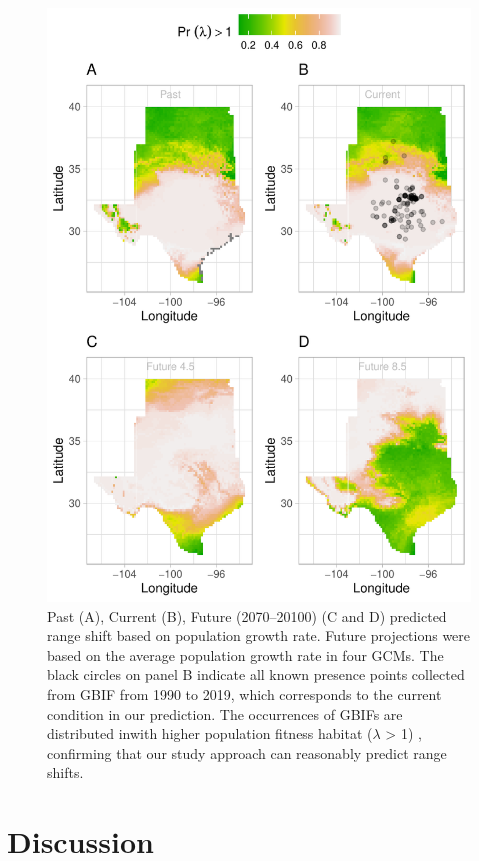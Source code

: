 \documentclass[12pt]{article}
\begin{document}
\begin{figure}%
  \begin{center}
    \includegraphics[width=0.78\linewidth]{Figures/Fig_geoPrlambdaprojection.pdf}
  \caption{Past (A), Current (B), Future (2070–20100) (C and D) predicted range shift based on population growth rate. Future projections were based on the average population growth rate in four GCMs. The black circles on panel B indicate all known presence points collected from GBIF from 1990 to 2019, which corresponds to the current condition in our prediction.  The occurrences of GBIFs are distributed inwith higher population fitness habitat ($\lambda$ > 1) , confirming that our study approach can reasonably predict range shifts. }
  \label{fig:geoproj}
  \end{center}
\end{figure}

\section*{Discussion}




\newpage


\newpage
\clearpage 
\setcounter{equation}{0}
\setcounter{figure}{0}
\setcounter{section}{0}
\setcounter{table}{0}
\renewcommand{\theequation}{S.\arabic{equation}}
\renewcommand{\thetable}{S-\arabic{table}}
\renewcommand{\thefigure}{S-\arabic{figure}}
\renewcommand{\thesection}{S.\arabic{section}}
\end{document}
